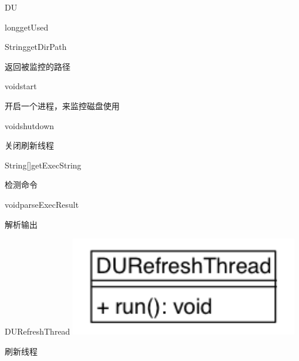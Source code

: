 \begin{XeClass}{DU}
\begin{XeMethod}{\XePublic}{long}{getUsed}
    \end{XeMethod}

    \begin{XeMethod}{\XePublic}{String}{getDirPath}
         
 返回被监控的路径

    \end{XeMethod}

    \begin{XeMethod}{\XePublic}{void}{start}
         
 开启一个进程，来监控磁盘使用

    \end{XeMethod}

    \begin{XeMethod}{\XePublic}{void}{shutdown}
         
 关闭刷新线程

    \end{XeMethod}

    \begin{XeMethod}{\XeProtected}{String[]}{getExecString}
         
 检测命令

    \end{XeMethod}

    \begin{XeMethod}{\XeProtected}{void}{parseExecResult}
         
 解析输出

    \end{XeMethod}

    \begin{XeInnerClass}{DURefreshThread}
\includegraphics[width=10cm]{cdig/DURefreshThread.png}
         
 刷新线程

    \end{XeInnerClass}
\end{XeClass}
